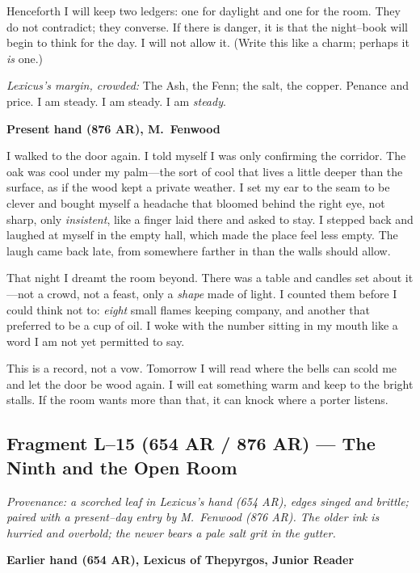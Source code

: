 \documentclass[11pt]{article}
\begin{document}
Henceforth I will keep two ledgers: one for daylight and one for the room. They do not contradict; they converse. If there is danger, it is that the night–book will begin to think for the day. I will not allow it. (Write this like a charm; perhaps it \emph{is} one.)

\medskip
\noindent\textit{Lexicus’s margin, crowded:} The Ash, the Fenn; the salt, the copper. Penance and price. I am steady. I am steady. I am \emph{steady}.

\medskip
\noindent\textbf{Present hand (876 AR), M.\ Fenwood}

I walked to the door again. I told myself I was only confirming the corridor. The oak was cool under my palm—the sort of cool that lives a little deeper than the surface, as if the wood kept a private weather. I set my ear to the seam to be clever and bought myself a headache that bloomed behind the right eye, not sharp, only \emph{insistent}, like a finger laid there and asked to stay. I stepped back and laughed at myself in the empty hall, which made the place feel less empty. The laugh came back late, from somewhere farther in than the walls should allow.

That night I dreamt the room beyond. There was a table and candles set about it—not a crowd, not a feast, only a \emph{shape} made of light. I counted them before I could think not to: \emph{eight} small flames keeping company, and another that preferred to be a cup of oil. I woke with the number sitting in my mouth like a word I am not yet permitted to say.

This is a record, not a vow. Tomorrow I will read where the bells can scold me and let the door be wood again. I will eat something warm and keep to the bright stalls. If the room wants more than that, it can knock where a porter listens.

\subsection{Fragment L--15 (654 AR / 876 AR) — The Ninth and the Open Room}
\label{frag:l15}

\noindent\textit{Provenance: a scorched leaf in Lexicus’s hand (654 AR), edges singed and brittle; paired with a present–day entry by M.\ Fenwood (876 AR). The older ink is hurried and overbold; the newer bears a pale salt grit in the gutter.}

\medskip
\noindent\textbf{Earlier hand (654 AR), Lexicus of Thepyrgos, Junior Reader}
\end{document}
